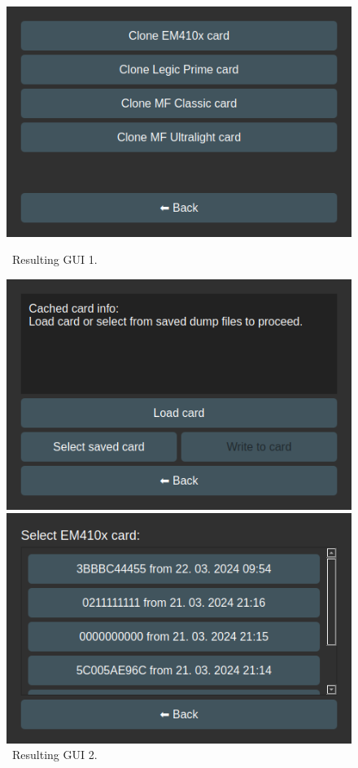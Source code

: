 \begin{figure}[h]
    \centering
    \begin{minipage}[b]{0.315\textwidth}
        \centering
        \includegraphics[width=\textwidth]{text/implementation/ui1.png}
        \caption{~Resulting GUI 1.}
        \label{fig:ui1}
    \end{minipage}
    \hfill
    \begin{minipage}[b]{0.315\textwidth}
        \centering
        \includegraphics[width=\textwidth]{text/implementation/ui2.png}
        \caption{~Resulting GUI 2.}
        \label{fig:ui2}
    \end{minipage}
    \hfill
    \begin{minipage}[b]{0.315\textwidth}
        \centering
        \includegraphics[width=\textwidth]{text/implementation/ui3.png}

\end{minipage}
\end{figure}
